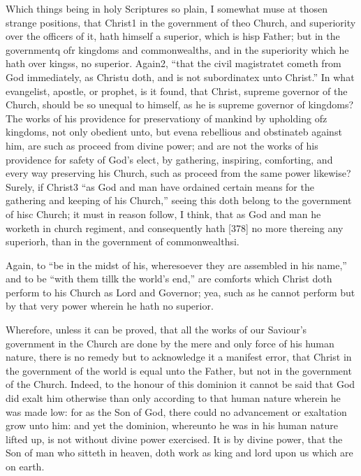 Which things being in holy Scriptures so plain, I somewhat muse at thosen strange positions, that Christ1 in the government of theo Church, and superiority over the officers of it, hath himself a superior, which is hisp Father; but in the governmentq ofr kingdoms and commonwealths, and in the superiority which he hath over kingss, no superior. Again2, “that the civil magistratet cometh from God immediately, as Christu doth, and is not subordinatex unto Christ.” In what evangelist, apostle, or prophet, is it found, that Christ, supreme governor of the Church, should be so unequal to himself, as he is supreme governor of kingdoms? The works of his providence for preservationy of mankind by upholding ofz kingdoms, not only obedient unto, but evena rebellious and obstinateb against him, are such as proceed from divine power; and are not the works of his providence for safety of God’s elect, by gathering, inspiring, comforting, and every way preserving his Church, such as proceed from the same power likewise? Surely, if Christ3 “as God and man have ordained certain means for the gathering and keeping of his Church,” seeing this doth belong to the government of hisc Church; it must in reason follow, I think, that as God and man he worketh in church regiment, and consequently hath [378] no more thereing any superiorh, than in the government of commonwealthsi.

Again, to “be in the midst of his, wheresoever they are assembled in his name,” and to be “with them tillk the world’s end,” are comforts which Christ doth perform to his Church as Lord and Governor; yea, such as he cannot perform but by that very power wherein he hath no superior.

Wherefore, unless it can be proved, that all the works of our Saviour’s government in the Church are done by the mere and only force of his human nature, there is no remedy but to acknowledge it a manifest error, that Christ in the government of the world is equal unto the Father, but not in the government of the Church. Indeed, to the honour of this dominion it cannot be said that God did exalt him otherwise than only according to that human nature wherein he was made low: for as the Son of God, there could no advancement or exaltation grow unto him: and yet the dominion, whereunto he was in his human nature lifted up, is not without divine power exercised. It is by divine power, that the Son of man who sitteth in heaven, doth work as king and lord upon us which are on earth.

